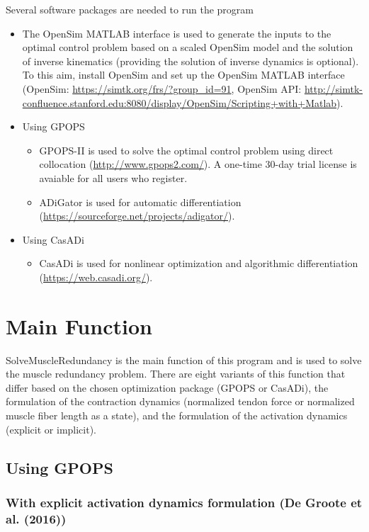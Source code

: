 \documentclass[a4paper,oneside,11pt]{article}
\begin{document}
Several software packages are needed to run the program
\begin{itemize}
	\item The OpenSim MATLAB interface is used to generate the inputs to the optimal control problem based on a scaled OpenSim model and the solution of inverse kinematics (providing the solution of inverse dynamics is optional). To this aim, install OpenSim and set up the OpenSim MATLAB interface (OpenSim: \url{https://simtk.org/frs/?group_id=91}, OpenSim API: \url{http://simtk-confluence.stanford.edu:8080/display/OpenSim/Scripting+with+Matlab}).
	\item Using GPOPS
	\begin{itemize}
	\item GPOPS-II is used to solve the optimal control problem using direct collocation (\url{http://www.gpops2.com/}). A one-time 30-day trial license is avaiable for all users who register.
	\item ADiGator is used for automatic differentiation (\url{https://sourceforge.net/projects/adigator/}).
	\end{itemize}
	\item Using CasADi
	\begin{itemize}
	\item CasADi is used for nonlinear optimization and algorithmic differentiation (\url{https://web.casadi.org/}).
	\end{itemize}
\end{itemize}

\section{Main Function}

SolveMuscleRedundancy is the main function of this program and is used to solve the muscle redundancy problem. There are eight variants of this function that differ based on the chosen optimization package (GPOPS or CasADi), the formulation of the contraction dynamics (normalized tendon force or normalized muscle fiber length as a state), and the formulation of the activation dynamics (explicit or implicit).

\subsection{Using GPOPS}

\subsubsection{With explicit activation dynamics formulation (De Groote et al. (2016))}
\end{document}
